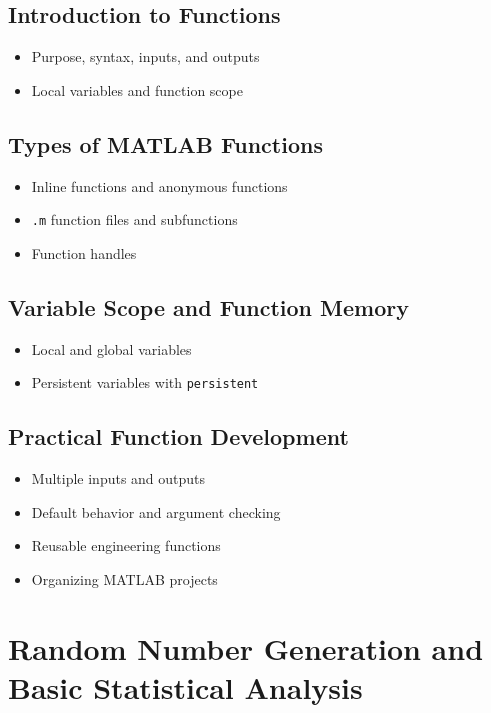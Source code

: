 \documentclass[11pt, a4paper]{article}
\begin{document}
\subsection{Introduction to Functions}
\begin{itemize}
  \item Purpose, syntax, inputs, and outputs
  \item Local variables and function scope
\end{itemize}

\subsection{Types of MATLAB Functions}
\begin{itemize}
  \item Inline functions and anonymous functions
  \item \texttt{.m} function files and subfunctions
  \item Function handles
\end{itemize}

\subsection{Variable Scope and Function Memory}
\begin{itemize}
  \item Local and global variables
  \item Persistent variables with \texttt{persistent}
\end{itemize}

\subsection{Practical Function Development}
\begin{itemize}
  \item Multiple inputs and outputs
  \item Default behavior and argument checking
  \item Reusable engineering functions
  \item Organizing MATLAB projects
\end{itemize}

\section{Random Number Generation and Basic Statistical Analysis}
\end{document}
